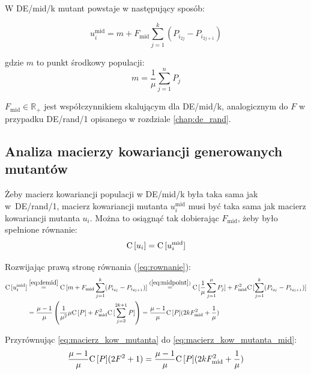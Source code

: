 \documentclass[a4paper,onecolumn,oneside,12pt,wide,floatssmall]{mwrep}
\def\C{{\rm C}\,}
\theoremstyle{definition}
\theoremstyle{plain}%
\theoremstyle{remark}
\begin{document}
W DE/mid/k mutant powstaje w następujący sposób:

\begin{equation} \label{eq:demid}
u_i^\text{mid} = m + F_\text{mid}\sum\limits_{j=1}^k (P_{i_{2j}} - P_{i_{2j+1}})
\end{equation}

gdzie $m$ to punkt środkowy populacji:
\begin{equation} \label{eq:midpoint}
m = \frac{1}{\mu}\sum\limits_{j=1}^n P_j
\end{equation}

$F_\text{mid}\in\mathbb{R_+}$ jest współczynnikiem skalującym dla DE/mid/k, analogicznym do $F$ 
w przypadku DE/rand/1 opisanego w rozdziale \ref{chap:de_rand}. 

\subsection{Analiza macierzy kowariancji generowanych mutantów}

Żeby macierz kowariancji populacji w DE/mid/k była taka sama jak w~DE/rand/1, 
macierz kowariancji mutanta $u_i^\text{mid}$ musi być taka sama jak macierz kowariancji mutanta $u_i$.
Można to osiągnąć tak dobierając $F_\text{mid}$, żeby było spełnione równanie:
\begin{equation} \label{eq:rownanie}
\C[u_i] = \C[u_i^\text{mid}]
\end{equation}

Rozwijając prawą stronę równania (\ref{eq:rownanie}):
\begin{equation}
\begin{align}
\label{eq:macierz_kow_mutanta_mid}
\C[u_i^\text{mid}] &\overset{\eqref{eq:demid}}{=} \C[m + F_\text{mid}\sum\limits_{j=1}^k (P_{i_{2j}} - P_{i_{2j+1}})] 
\overset{(\ref{eq:midpoint})}{=} \C[\frac{1}{\mu}\sum\limits_{j=1}^\mu P_j] + F_\text{mid}^2\C[\sum\limits_{j=1}^k (P_{i_{2j}} - P_{i_{2j+1}})] \\
&= \frac{\mu - 1}{\mu}\left(\frac{1}{\mu^2}\mu\C[P] + F_\text{mid}^2\C[\sum\limits_{j=2}^{2k+1} P]\right) 
= \frac{\mu - 1}{\mu}\C[P](2kF_\text{mid}^2 + \frac{1}{\mu})
\end{align}
\end{equation}

Przyrównując \eqref{eq:macierz_kow_mutanta} do \eqref{eq:macierz_kow_mutanta_mid}:
\begin{align*}
\frac{\mu - 1}{\mu}\C[P](2F^2 + 1) = \frac{\mu - 1}{\mu}\C[P](2kF_\text{mid}^2 + \frac{1}{\mu})
\end{align*}
\end{document}
